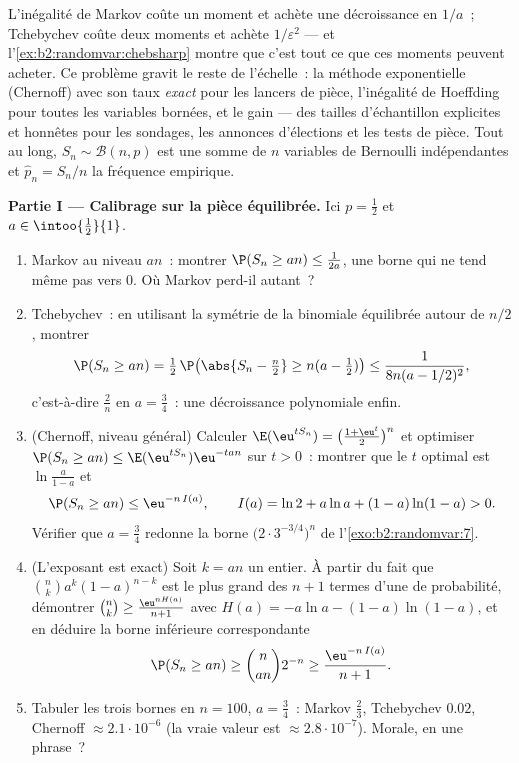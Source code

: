 \begin{problem}
\label{pb:b2:randomvar:1}
L'inégalité de Markov coûte un moment et achète une décroissance en $1/a$~;
Tchebychev coûte deux moments et achète $1/\varepsilon^2$ ---
et l'\cref{ex:b2:randomvar:chebsharp} montre que c'est tout ce que ces
moments peuvent acheter. Ce problème gravit le reste de l'échelle~:
la méthode exponentielle (Chernoff) avec son taux \emph{exact}
pour les lancers de pièce, l'inégalité de Hoeffding pour toutes les variables
bornées, et le gain --- des tailles d'échantillon explicites et
honnêtes pour les sondages, les annonces d'élections et les tests de pièce.
 Tout au long, $S_n \sim
\mathcal B(n, p)$ est une somme de $n$ variables de Bernoulli
indépendantes et $\widehat p_n = S_n/n$ la fréquence empirique.

\medskip
\noindent\textbf{Partie I --- Calibrage sur la pièce équilibrée.}
Ici $p = \frac12$ et $a \in \intoo{\frac12}{1}$.
\begin{enumerate}
  \item Markov au niveau $an$~: montrer $\P(S_n \geq an) \leq
        \frac1{2a}$, une borne qui ne tend même pas vers $0$.
        Où Markov perd-il autant~?
  \item Tchebychev~: en utilisant la symétrie de la binomiale équilibrée
        autour de $n/2$, montrer
        \[
        \P(S_n \geq an) = \tfrac12\,
        \P\bigl(\abs{S_n - \tfrac n2} \geq n(a -
        \tfrac12)\bigr)
        \leq \frac{1}{8n(a - 1/2)^2},
        \]
        c'est-à-dire $\frac2n$ en $a = \frac34$~: une décroissance
        polynomiale enfin.
  \item (Chernoff, niveau général) Calculer
        $\E(\eu^{tS_n}) = \bigl(\frac{1 + \eu^t}2\bigr)^n$ et
        optimiser $\P(S_n \geq an) \leq
        \E(\eu^{tS_n})\eu^{-tan}$ sur $t > 0$~: montrer que le
        $t$ optimal est $\ln\frac{a}{1-a}$ et
        \[
        \P(S_n \geq an) \leq \eu^{-n\,I(a)},
        \qquad
        I(a) = \ln 2 + a\ln a + (1-a)\ln(1-a) > 0 .
        \]
        Vérifier que $a = \frac34$ redonne la borne
        $\bigl(2\cdot3^{-3/4}\bigr)^n$ de
        l'\cref{exo:b2:randomvar:7}.
  \item (L'exposant est exact) Soit $k = an$ un entier.
        À partir du fait que $\binom nk a^k(1-a)^{n-k}$ est le
        plus grand des $n + 1$ termes d'une  de
        probabilité, démontrer $\binom nk \geq
        \frac{\eu^{nH(a)}}{n+1}$ avec $H(a) = -a\ln a -
        (1-a)\ln(1-a)$, et en déduire la borne inférieure
        correspondante
        \[
        \P(S_n \geq an) \geq \binom{n}{an}2^{-n}
        \geq \frac{\eu^{-n\,I(a)}}{n + 1} .
        \]
  \item Tabuler les trois bornes en $n = 100$, $a =
        \frac34$~: Markov $\frac23$, Tchebychev $0.02$,
        Chernoff $\approx 2.1\cdot10^{-6}$ (la vraie valeur est
        $\approx 2.8\cdot10^{-7}$). Morale, en une phrase~?
\end{enumerate}


\end{problem}
